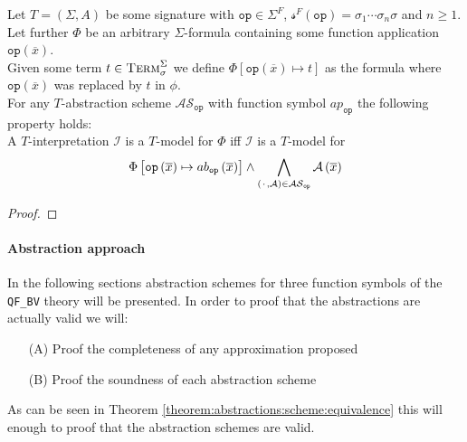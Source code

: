 \begin{theorem}
\label{theorem:abstractions:scheme:equivalence}
Let $T=\left(\Sigma,A\right)$ be some signature with $\texttt{op}\in\Sigma^F$, $\mathcal{s}^F\left(\texttt{op}\right)=\sigma_1\dotsi\sigma_n\sigma$ and $n\geq1$.\\
Let further $\Phi$ be an arbitrary $\Sigma$-formula containing some function application $\texttt{op}\left(\overline{x}\right)$.\\
Given some term $t\in\textsc{Term}_\sigma^\Sigma$ we define $\Phi\left[\texttt{op}\left(\overline{x}\right)\mapsto t \right]$ as the formula where $\texttt{op}\left(\overline{x}\right)$ was replaced by $t$ in $\phi$.\\
For any $T$-abstraction scheme $\mathcal{AS}_{\texttt{op}}$ with function symbol $ap_{\texttt{op}}$ the following property holds:\\
A $T$-interpretation $\mathcal{I}$ is a $T$-model for $\Phi$ iff $\mathcal{I}$ is a $T$-model for 
\[
\Phi\left[ \texttt{op}\left(\overline{x}\right) \mapsto ab_{\texttt{op}}\left(\overline{x}\right) \right] \land \bigwedge\limits_{\left({\mkern 2mu\cdot\mkern 2mu},\mathcal{A}\right)\in\mathcal{AS}_{\texttt{op}}} \mathcal{A}\left(\overline{x}\right)
\]
\begin{proof}
\end{proof}
\end{theorem}

\paragraph{Abstraction approach}
In the following sections abstraction schemes for three function symbols of the \texttt{QF\_BV} theory will be presented. In order to proof that the abstractions are actually valid we will:
\begin{itemize}
    \item[(A)] Proof the completeness of any approximation proposed
    \item[(B)] Proof the soundness of each abstraction scheme
\end{itemize}
As can be seen in Theorem \ref{theorem:abstractions:scheme:equivalence} this will enough to proof that the abstraction schemes are valid.




































